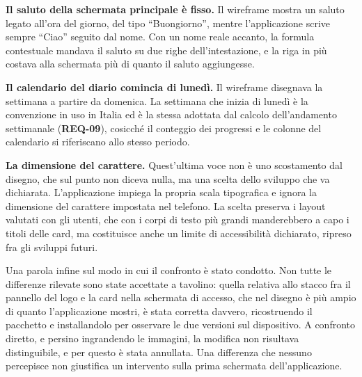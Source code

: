 \textbf{Il saluto della schermata principale è fisso.}
Il wireframe mostra un saluto legato all'ora del giorno, del tipo \enquote{Buongiorno}, mentre l'applicazione scrive sempre \enquote{Ciao} seguito dal nome.
Con un nome reale accanto, la formula contestuale mandava il saluto su due righe dell'intestazione, e la riga in più costava alla schermata più di quanto il saluto aggiungesse.

\textbf{Il calendario del diario comincia di lunedì.}
Il wireframe disegnava la settimana a partire da domenica.
La settimana che inizia di lunedì è la convenzione in uso in Italia ed è la stessa adottata dal calcolo dell'andamento settimanale (\textbf{REQ-09}), cosicché il conteggio dei progressi e le colonne del calendario si riferiscano allo stesso periodo.

\textbf{La dimensione del carattere.}
Quest'ultima voce non è uno scostamento dal disegno, che sul punto non diceva nulla, ma una scelta dello sviluppo che va dichiarata.
L'applicazione impiega la propria scala tipografica e ignora la dimensione del carattere impostata nel telefono.
La scelta preserva i layout valutati con gli utenti, che con i corpi di testo più grandi manderebbero a capo i titoli delle card, ma costituisce anche un limite di accessibilità dichiarato, ripreso fra gli sviluppi futuri.

Una parola infine sul modo in cui il confronto è stato condotto.
Non tutte le differenze rilevate sono state accettate a tavolino: quella relativa allo stacco fra il pannello del logo e la card nella schermata di accesso, che nel disegno è più ampio di quanto l'applicazione mostri, è stata corretta davvero, ricostruendo il pacchetto e installandolo per osservare le due versioni sul dispositivo.
A confronto diretto, e persino ingrandendo le immagini, la modifica non risultava distinguibile, e per questo è stata annullata.
Una differenza che nessuno percepisce non giustifica un intervento sulla prima schermata dell'applicazione.
